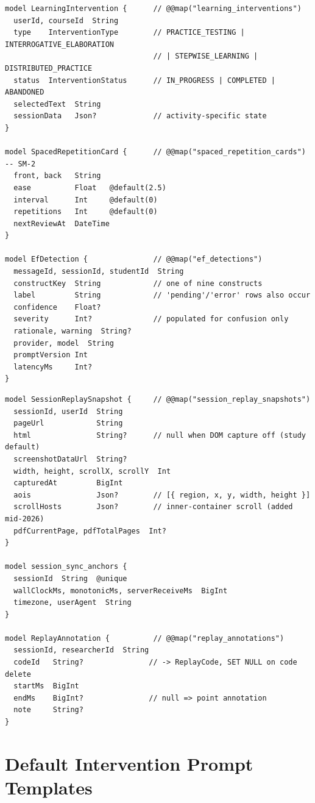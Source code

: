 \begin{lstlisting}[caption={Interventions, spaced repetition, and text-mining.}]
model LearningIntervention {      // @@map("learning_interventions")
  userId, courseId  String
  type    InterventionType        // PRACTICE_TESTING | INTERROGATIVE_ELABORATION
                                  // | STEPWISE_LEARNING | DISTRIBUTED_PRACTICE
  status  InterventionStatus      // IN_PROGRESS | COMPLETED | ABANDONED
  selectedText  String
  sessionData   Json?             // activity-specific state
}

model SpacedRepetitionCard {      // @@map("spaced_repetition_cards") -- SM-2
  front, back   String
  ease          Float   @default(2.5)
  interval      Int     @default(0)
  repetitions   Int     @default(0)
  nextReviewAt  DateTime
}

model EfDetection {               // @@map("ef_detections")
  messageId, sessionId, studentId  String
  constructKey  String            // one of nine constructs
  label         String            // 'pending'/'error' rows also occur
  confidence    Float?
  severity      Int?              // populated for confusion only
  rationale, warning  String?
  provider, model  String
  promptVersion Int
  latencyMs     Int?
}
\end{lstlisting}

\begin{lstlisting}[caption={Replay snapshots, sync anchor, and coding.}]
model SessionReplaySnapshot {     // @@map("session_replay_snapshots")
  sessionId, userId  String
  pageUrl            String
  html               String?      // null when DOM capture off (study default)
  screenshotDataUrl  String?
  width, height, scrollX, scrollY  Int
  capturedAt         BigInt
  aois               Json?        // [{ region, x, y, width, height }]
  scrollHosts        Json?        // inner-container scroll (added mid-2026)
  pdfCurrentPage, pdfTotalPages  Int?
}

model session_sync_anchors {
  sessionId  String  @unique
  wallClockMs, monotonicMs, serverReceiveMs  BigInt
  timezone, userAgent  String
}

model ReplayAnnotation {          // @@map("replay_annotations")
  sessionId, researcherId  String
  codeId   String?               // -> ReplayCode, SET NULL on code delete
  startMs  BigInt
  endMs    BigInt?               // null => point annotation
  note     String?
}
\end{lstlisting}

\chapter{Default Intervention Prompt Templates}
\label{app:prompts}

